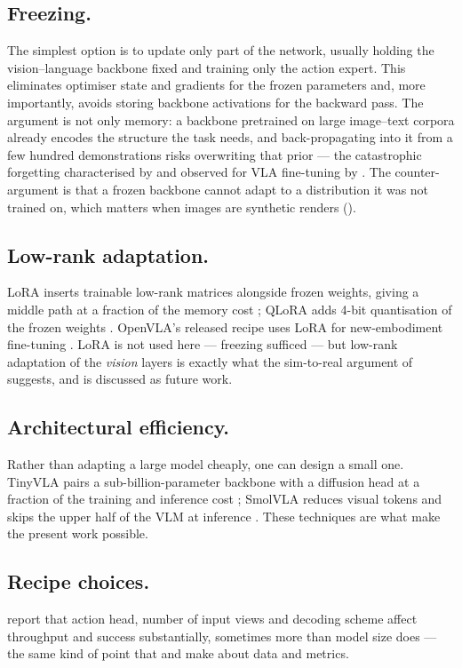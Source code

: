 \subsection{Freezing.} The simplest option is to update only part of the network,
usually holding the vision--language backbone fixed and training only the action
expert. This eliminates optimiser state and gradients for the frozen parameters and,
more importantly, avoids storing backbone activations for the backward pass. The
argument is not only memory: a backbone pretrained on large image--text corpora already
encodes the structure the task needs, and back-propagating into it from a few hundred
demonstrations risks overwriting that prior --- the catastrophic forgetting
characterised by \textcite{kirkpatrick2017ewc} and observed for VLA fine-tuning by
\textcite{kiviranta2025smolvla}. The counter-argument is that a frozen backbone cannot
adapt to a distribution it was not trained on, which matters when images are synthetic
renders ().

\subsection{Low-rank adaptation.} LoRA inserts trainable low-rank matrices alongside
frozen weights, giving a middle path at a fraction of the memory cost
\parencite{hu2022lora}; QLoRA adds 4-bit quantisation of the frozen weights
\parencite{dettmers2023qlora}. OpenVLA's released recipe uses LoRA for new-embodiment
fine-tuning \parencite{kim2024openvla}. LoRA is not used here --- freezing sufficed ---
but low-rank adaptation of the \emph{vision} layers is exactly what the sim-to-real
argument of  suggests, and is discussed as future work.

\subsection{Architectural efficiency.} Rather than adapting a large model cheaply, one
can design a small one. TinyVLA pairs a sub-billion-parameter backbone with a diffusion
head at a fraction of the training and inference cost \parencite{wen2025tinyvla};
SmolVLA reduces visual tokens and skips the upper half of the VLM at inference
\parencite{shukor2025smolvla}. These techniques are what make the present work possible.

\subsection{Recipe choices.} \textcite{kim2025oft} report that action head, number of
input views and decoding scheme affect throughput and success substantially, sometimes
more than model size does --- the same kind of point that  and
 make about data and metrics.

